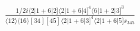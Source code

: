 \documentclass[varwidth, border=5pt]{standalone}
\begin{document}
\begin{my}
$\begin{gathered}
\scriptscriptstyle\frac{1/2i\langle2|1+6|2]\langle2|1+6|4]^4\langle6|1+2|3]^3}{\langle12\rangle\langle16\rangle[34][45]\langle2|1+6|3]^4\langle2|1+6|5]s_{345}}
\end{gathered}$
\end{my}
\end{document}
